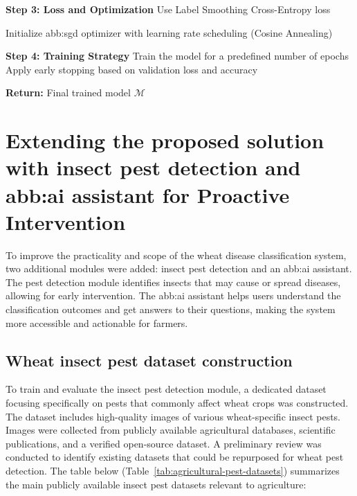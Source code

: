 \begin{algorithm}[H]
\vspace{2mm}
\textbf{Step 3: Loss and Optimization}\;
Use Label Smoothing Cross-Entropy loss\;

Initialize \gls{abb:sgd} optimizer with learning rate scheduling (Cosine Annealing)\;

\vspace{2mm}
\textbf{Step 4: Training Strategy}\;
Train the model for a predefined number of epochs\;
Apply early stopping based on validation loss and accuracy\;

\vspace{2mm}
\textbf{Return:} Final trained model $\mathcal{M}$\;
\end{algorithm}



\section{Extending the proposed solution with insect pest detection and \gls{abb:ai} assistant for Proactive Intervention}
To improve the practicality and scope of the wheat disease classification system, two additional modules were added: insect pest detection and an \gls{abb:ai} assistant. The pest detection module identifies insects that may cause or spread diseases, allowing for early intervention. The \gls{abb:ai} assistant helps users understand the classification outcomes and get answers to their questions, making the system more accessible and actionable for farmers.

\subsection{Wheat insect pest dataset construction}

To train and evaluate the insect pest detection module, a dedicated dataset focusing specifically on pests that commonly affect wheat crops was constructed. The dataset includes high-quality images of various wheat-specific insect pests. Images were collected from publicly available agricultural databases, scientific publications, and a verified open-source dataset.
A preliminary review was conducted to identify existing datasets that could be repurposed for wheat pest detection. The table below (Table~\ref{tab:agricultural-pest-datasets}) summarizes the main publicly available insect pest datasets relevant to agriculture:

